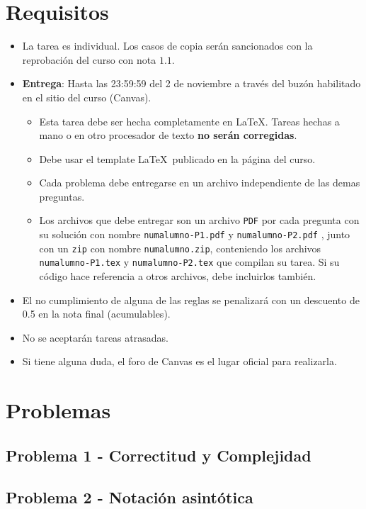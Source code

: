 \documentclass[12pt]{article}
\begin{document}
\section*{Requisitos}
\begin{itemize}

  \item La tarea es individual. Los casos de copia serán sancionados con la
   reprobación del curso con nota $1.1$.

  \item \textbf{Entrega}: Hasta las 23:59:59 del 2 de noviembre a través del buzón habilitado en el sitio del curso (Canvas).

  \begin{itemize}

    \item Esta tarea debe ser hecha completamente en \LaTeX. Tareas hechas a mano o
    en otro procesador de texto \textbf{no serán corregidas}.

    \item Debe usar el template \LaTeX\ publicado en la página del curso.

    \item Cada problema debe entregarse en un archivo independiente de las demas preguntas.

    \item Los archivos que debe entregar son un archivo \texttt{PDF} por cada pregunta
    con su solución con nombre \texttt{numalumno-P1.pdf} y \texttt{numalumno-P2.pdf} ,
    junto con un \texttt{zip} con nombre \texttt{numalumno.zip}, conteniendo los archivos \texttt{numalumno-P1.tex} y \texttt{numalumno-P2.tex} que compilan su tarea.
    Si su código hace referencia a otros archivos, debe incluirlos también.

  \end{itemize}

  \item El no cumplimiento de alguna de las reglas se penalizará con un descuento de 0.5 en la nota final (acumulables).

  \item No se aceptarán tareas atrasadas.

  \item Si tiene alguna duda, el foro de Canvas es el lugar oficial para realizarla.
\end{itemize}


\newpage
\section*{Problemas}

    \subsection*{Problema 1 - Correctitud y Complejidad}
      
     \newpage
     \subsection*{Problema 2 - Notación asintótica}
      
\end{document}
